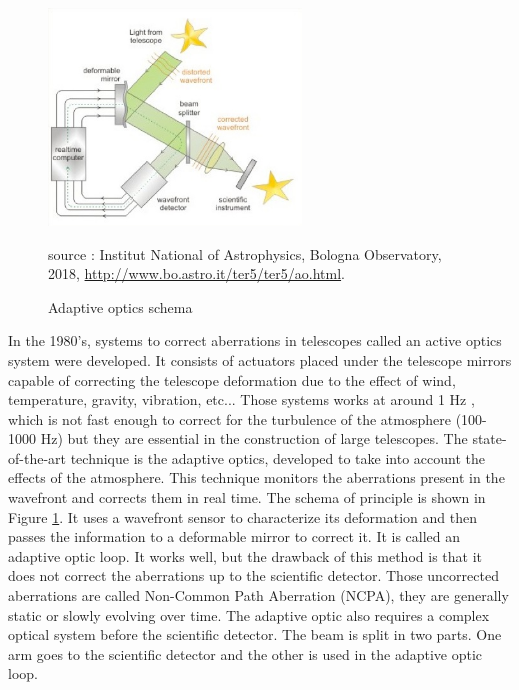 \begin{figure}
\begin{center}
\includegraphics[width=0.6\textwidth,angle=0]{Figures/ao_scheme.jpg}
\caption{Adaptive optics schema}
source : Institut National of Astrophysics, Bologna Observatory, 2018, \url{http://www.bo.astro.it/ter5/ter5/ao.html}.
\label{fig:ao_scheme}
\end{center}
\end{figure}

In the 1980's, systems to correct aberrations in telescopes called an active optics system were developed. It consists of actuators placed under the telescope mirrors capable of correcting the telescope deformation due to the effect of wind, temperature, gravity, vibration, etc... Those systems works at  around 1 Hz , which is not fast enough to correct for the turbulence of the atmosphere (100-1000 Hz) but they are essential in the construction of large telescopes. The state-of-the-art technique is the adaptive optics, developed to take into account the effects of the atmosphere. This technique monitors the aberrations present in the wavefront and corrects them in real time. The schema of principle is shown in Figure \ref{fig:ao_scheme}. It uses a wavefront sensor to characterize its deformation and then passes the information to a deformable mirror to correct it. It is called an adaptive optic loop. It works well, but the drawback of this method is that it does not correct the aberrations up to the scientific detector. Those uncorrected aberrations are called Non-Common Path Aberration (NCPA), they are generally static or slowly evolving over time. The adaptive optic also requires a complex optical system before the scientific detector. The beam is split in two parts. One arm goes to the scientific detector and the other is used in the adaptive optic loop.

